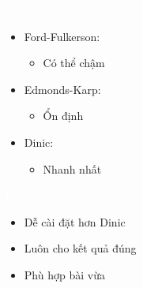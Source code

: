 \documentclass{beamer}
\newcommand{\hlgreen}[1]{\textcolor{mygreen}{#1}}
\newcommand{\hlpurple}[1]{\textcolor{mypurple}{#1}}
\newcommand{\hlwhite}[1]{\textcolor{white}{#1}}
\begin{document}

\begin{frame}{\hlwhite{So sánh}}
\begin{itemize}
\item Ford-Fulkerson:
\begin{itemize}
\item Có thể chậm
\end{itemize}

\item Edmonds-Karp:
\begin{itemize}
\item \hlgreen{Ổn định}
\end{itemize}

\item Dinic:
\begin{itemize}
\item \hlpurple{Nhanh nhất}
\end{itemize}
\end{itemize}
\end{frame}


\begin{frame}{\hlwhite{Kết luận}}
\begin{itemize}
\item Dễ cài đặt hơn Dinic
\item Luôn cho kết quả đúng
\item Phù hợp bài vừa
\end{itemize}
\end{frame}
\end{document}
